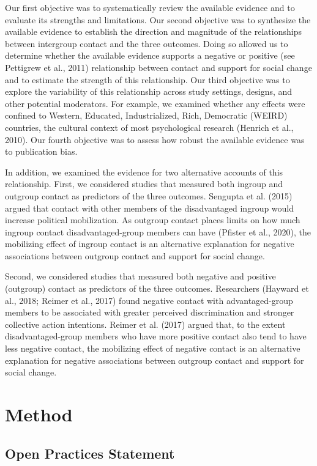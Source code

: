 \documentclass[12pt, letterpaper]{article}
\begin{document}
Our first objective was to systematically review the available evidence
and to evaluate its strengths and limitations. Our second objective was
to synthesize the available evidence to establish the direction and
magnitude of the relationships between intergroup contact and the three
outcomes. Doing so allowed us to determine whether the available
evidence supports a negative or positive (see Pettigrew et al., 2011)
relationship between contact and support for social change and to
estimate the strength of this relationship. Our third objective was to
explore the variability of this relationship across study settings,
designs, and other potential moderators. For example, we examined
whether any effects were confined to Western, Educated, Industrialized,
Rich, Democratic (WEIRD) countries, the cultural context of most
psychological research (Henrich et al., 2010). Our fourth objective was
to assess how robust the available evidence was to publication bias.

In addition, we examined the evidence for two alternative accounts of
this relationship. First, we considered studies that measured both
ingroup and outgroup contact as predictors of the three outcomes.
Sengupta et al. (2015) argued that contact with other members of the
disadvantaged ingroup would increase political mobilization. As outgroup
contact places limits on how much ingroup contact disadvantaged-group
members can have (Pfister et al., 2020), the mobilizing effect of
ingroup contact is an alternative explanation for negative associations
between outgroup contact and support for social change.

Second, we considered studies that measured both negative and positive
(outgroup) contact as predictors of the three outcomes. Researchers
(Hayward et al., 2018; Reimer et al., 2017) found negative contact with
advantaged-group members to be associated with greater perceived
discrimination and stronger collective action intentions. Reimer et al.
(2017) argued that, to the extent disadvantaged-group members who have
more positive contact also tend to have less negative contact, the
mobilizing effect of negative contact is an alternative explanation for
negative associations between outgroup contact and support for social
change.

\hypertarget{method}{%
\section{Method}\label{method}}

\hypertarget{open-practices-statement}{%
\subsection{Open Practices Statement}\label{open-practices-statement}}
\end{document}
